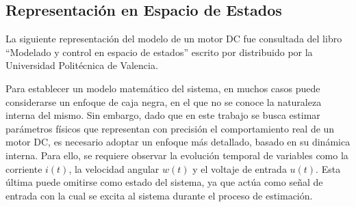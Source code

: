 \subsection{Representación en Espacio de Estados}
\label{sec:CH02_Representacion_MEE}
    La siguiente representación del modelo de un motor \ac{DC} fue consultada del libro “Modelado y control en espacio de estados” escrito por \textcite{MEE} distribuido por la Universidad Politécnica de Valencia.
    
    Para establecer un modelo matemático del sistema, en muchos casos puede considerarse un enfoque de caja negra, en el que no se conoce la naturaleza interna del mismo. Sin embargo, dado que en este trabajo se busca estimar parámetros físicos que representan con precisión el comportamiento real de un motor \ac{DC}, es necesario adoptar un enfoque más detallado, basado en su dinámica interna. Para ello, se requiere observar la evolución temporal de variables como la corriente $i(t)$, la velocidad angular $w(t)$ y el voltaje de entrada $u(t)$. Esta última puede omitirse como estado del sistema, ya que actúa como señal de entrada con la cual se excita al sistema durante el proceso de estimación.
  
